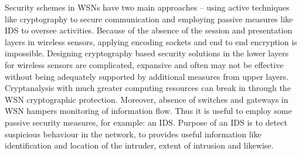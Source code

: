 \documentclass[conference]{IEEEtran}
\begin{document}
Security schemes in WSNs have two main approaches -- using active techniques like cryptography to secure communication and  employing passive measures like IDS to oversee activities.
Because  of the absence of the session and presentation layers in wireless sensors, applying encoding sockets and end to end encryption is impossible.
Designing cryptography based security solutions in the lower layers for wireless sensors are complicated, expansive and often may not be effective without being adequately supported by additional measures from upper layers.
Cryptanalysis with much greater computing resources can break in through the WSN cryptographic protection.
Moreover, absence of switches and gateways in WSN hampers monitoring of information flow.
Thus it is useful to employ some passive security measures, for example: an IDS.
Purpose of an IDS is to detect suspicious behaviour in the network, to provides useful information like identification and location of the intruder, extent of intrusion and likewise.
\end{document}
